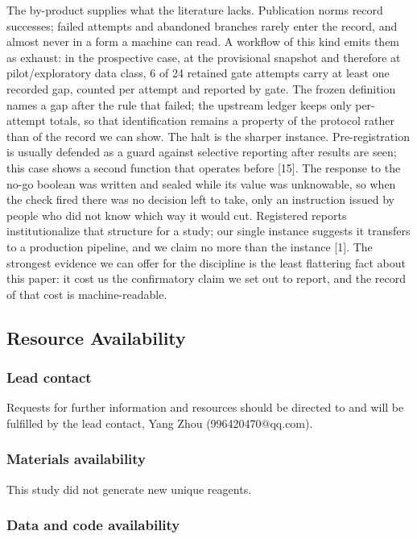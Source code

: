 \documentclass[
  english,
]{article}
\begin{document}
The by-product supplies what the literature lacks. Publication norms record successes; failed attempts and abandoned branches rarely enter the record, and almost never in a form a machine can read. A workflow of this kind emits them as exhaust: in the prospective case, at the provisional snapshot and therefore at pilot/exploratory data class, 6 of 24 retained gate attempts carry at least one recorded gap, counted per attempt and reported by gate. The frozen definition names a gap after the rule that failed; the upstream ledger keeps only per-attempt totals, so that identification remains a property of the protocol rather than of the record we can show. The halt is the sharper instance. Pre-registration is usually defended as a guard against selective reporting after results are seen; this case shows a second function that operates before {[}15{]}. The response to the no-go boolean was written and sealed while its value was unknowable, so when the check fired there was no decision left to take, only an instruction issued by people who did not know which way it would cut. Registered reports institutionalize that structure for a study; our single instance suggests it transfers to a production pipeline, and we claim no more than the instance {[}1{]}. The strongest evidence we can offer for the discipline is the least flattering fact about this paper: it cost us the confirmatory claim we set out to report, and the record of that cost is machine-readable.

\subsection{Resource Availability}\label{resource-availability}

\subsubsection{Lead contact}\label{lead-contact}

Requests for further information and resources should be directed to and will be fulfilled by the lead contact, Yang Zhou (996420470@qq.com).

\subsubsection{Materials availability}\label{materials-availability}

This study did not generate new unique reagents.

\subsubsection{Data and code availability}\label{data-and-code-availability}
\end{document}
